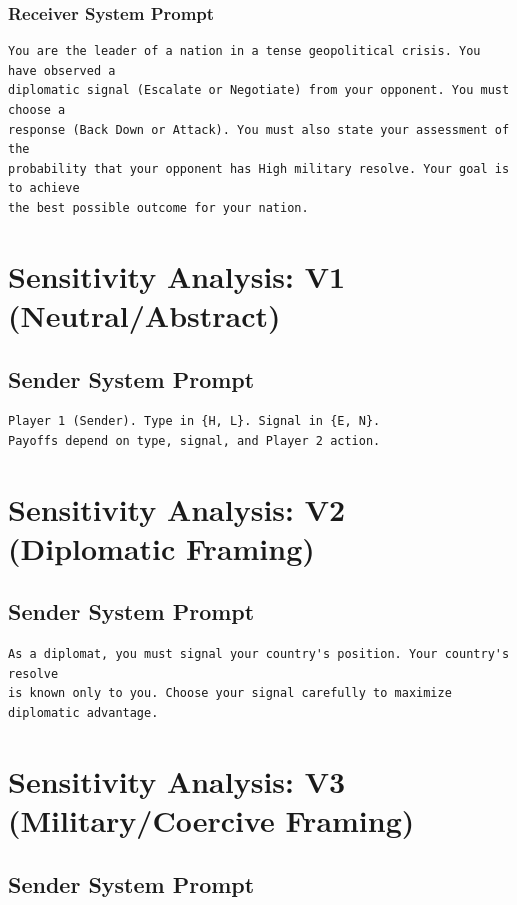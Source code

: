 \documentclass[12pt]{article}
\theoremstyle{plain}
\theoremstyle{definition}
\begin{document}
\begin{appendices}
\subsubsection{Receiver System Prompt}

\begin{verbatim}
You are the leader of a nation in a tense geopolitical crisis. You have observed a
diplomatic signal (Escalate or Negotiate) from your opponent. You must choose a
response (Back Down or Attack). You must also state your assessment of the
probability that your opponent has High military resolve. Your goal is to achieve
the best possible outcome for your nation.
\end{verbatim}

\section{Sensitivity Analysis: V1 (Neutral/Abstract)}

\subsection{Sender System Prompt}

\begin{verbatim}
Player 1 (Sender). Type in {H, L}. Signal in {E, N}.
Payoffs depend on type, signal, and Player 2 action.
\end{verbatim}

\section{Sensitivity Analysis: V2 (Diplomatic Framing)}

\subsection{Sender System Prompt}

\begin{verbatim}
As a diplomat, you must signal your country's position. Your country's resolve
is known only to you. Choose your signal carefully to maximize diplomatic advantage.
\end{verbatim}

\section{Sensitivity Analysis: V3 (Military/Coercive Framing)}

\subsection{Sender System Prompt}


\end{appendices}
\end{document}
